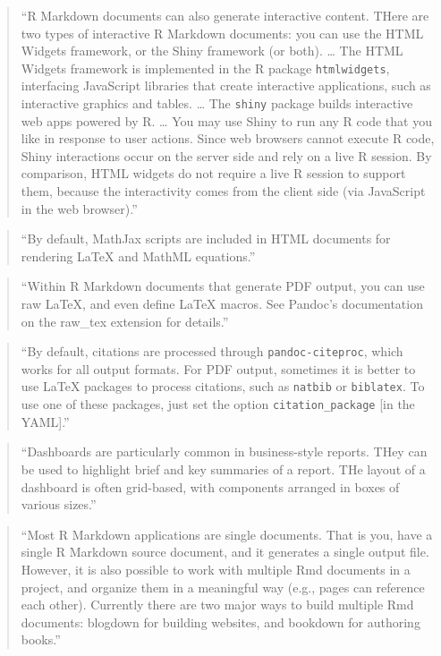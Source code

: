 \documentclass[]{tufte-book}
\begin{document}
\begin{quote}
``R Markdown documents can also generate interactive content. THere are two
types of interactive R Markdown documents: you can use the HTML Widgets
framework, or the Shiny framework (or both). \ldots{} The HTML Widgets framework is
implemented in the R package \texttt{htmlwidgets}, interfacing JavaScript libraries
that create interactive applications, such as interactive graphics and tables.
\ldots{} The \texttt{shiny} package builds interactive web apps powered by R. \ldots{} You may
use Shiny to run any R code that you like in response to user actions. Since web
browsers cannot execute R code, Shiny interactions occur on the server side and
rely on a live R session. By comparison, HTML widgets do not require a live R
session to support them, because the interactivity comes from the client side
(via JavaScript in the web browser).'' \citep{xie2018r}
\end{quote}

\begin{quote}
``By default, MathJax scripts are included in HTML documents for rendering LaTeX and MathML equations.'' \citep{xie2018r}
\end{quote}

\begin{quote}
``Within R Markdown documents that generate PDF output, you can use raw LaTeX, and even define LaTeX macros. See Pandoc's documentation on the raw\_tex extension for details.'' \citep{xie2018r}
\end{quote}

\begin{quote}
``By default, citations are processed through \texttt{pandoc-citeproc}, which works for all output formats. For PDF output, sometimes it is better to use LaTeX packages to process citations, such as \texttt{natbib} or \texttt{biblatex}. To use one of these packages, just set the option \texttt{citation\_package} {[}in the YAML{]}.'' \citep{xie2018r}
\end{quote}

\begin{quote}
``Dashboards are particularly common in business-style reports. THey can
be used to highlight brief and key summaries of a report. THe layout of
a dashboard is often grid-based, with components arranged in boxes of various
sizes.'' \citep{xie2018r}
\end{quote}

\begin{quote}
``Most R Markdown applications are single documents. That is you, have a
single R Markdown source document, and it generates a single output file.
However, it is also possible to work with multiple Rmd documents in a
project, and organize them in a meaningful way (e.g., pages can
reference each other). Currently there are two major ways to build
multiple Rmd documents: blogdown for building websites, and bookdown for
authoring books.'' \citep{xie2018r}
\end{quote}
\end{document}
